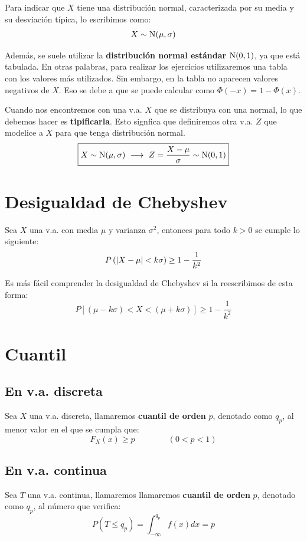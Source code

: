 \documentclass[a4paper]{book}
\begin{document}
Para indicar que $X$ tiene una distribución normal, caracterizada por su media y su desviación típica, lo escribimos como: \[X \sim \operatorname{N}(\mu , \sigma ) \]

Además, se suele utilizar la \textbf{distribución normal estándar} $\operatorname{N}(0,1)$, ya que está tabulada. En otras palabras, para realizar los ejercicios utilizaremos una tabla con los valores más utilizados. Sin embargo, en la tabla no aparecen valores negativos de $X$. Eso se debe a que se puede calcular como $\Phi (-x) = 1 - \Phi(x)$.

Cuando nos encontremos con una v.a. $X$ que se distribuya con una normal, lo que debemos hacer es \textbf{tipificarla}. Esto signfica que definiremos otra v.a. $Z$ que modelice a $X$ para que tenga distribución normal.
\[\boxed{X \sim \operatorname{N}(\mu ,\sigma ) \ \longrightarrow \ Z = \frac{X-\mu}{\sigma} \sim \operatorname{N}(0,1)}\]

\section{Desigualdad de Chebyshev}
Sea $X$ una v.a. con media $\mu$ y varianza $\sigma ^2$, entonces para todo $k>0$ se cumple lo siguiente: \[P\left( \abs{X-\mu} < k\sigma \right)\geq 1 - \frac{1}{k^2}\]

\begin{nota}
	Es más fácil comprender la desigualdad de Chebyshev si la reescribimos de esta forma: \[ P\left[ (\mu - k\sigma )< X < (\mu +k\sigma ) \right] \geq 1 - \frac{1}{k^2}\]
\end{nota}


\section{Cuantil}
\subsection*{En v.a. discreta}
Sea $X$ una v.a. discreta, llamaremos \textbf{cuantil de orden} $p$, denotado como $q_p$, al menor valor en el que se cumpla que: \[F_X(x)\geq p \qquad \qquad \left( 0 < p < 1 \right) \]

\subsection*{En v.a. continua}
Sea $T$ una v.a. continua, llamaremos llamaremos \textbf{cuantil de orden} $p$, denotado como $q_p$, al número que verifica: \[P\left( T \leq q_p \right) = \int_{-\infty}^{q_p}{f(x)dx} = p\]
\end{document}
